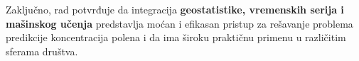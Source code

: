 \documentclass[12pt]{article}
\begin{document}
Zaključno, rad potvrđuje da integracija \textbf{geostatistike, vremenskih serija i mašinskog učenja} predstavlja moćan i efikasan pristup za rešavanje problema predikcije koncentracija polena i da ima široku praktičnu primenu u različitim sferama društva.



\newpage

\end{document}
